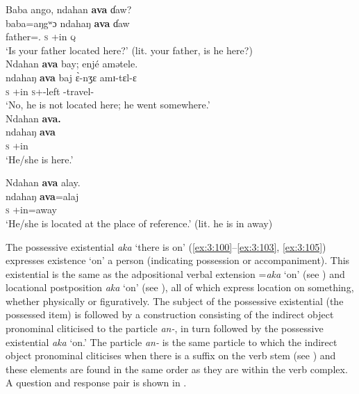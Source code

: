 \ea\label{ex:3:97}
\ea Baba  ango,  ndahan  \textbf{ava}  ɗaw? \\
\gll  baba=aŋgʷɔ      ndahaŋ    \textbf{ava}  ɗaw \\
      father={\twoS}.{\POSS}    \textsc{s}        {\EXT}+in   {\textsc{q}} \\
\glt  `Is your father located here?' (lit. your father, is he here?)     
       \\\medskip
       \ex
 Ndahan  \textbf{ava}  bay;  enjé  amətele.\\
\gll ndahaŋ  \textbf{ava}  baj    \`{ɛ}-nʒɛ    amɪ-tɛl-ɛ\\
        \textsc{s}       {\EXT}+in  {\NEG}   \textsc{s}+{\PFV}-left {\DEP}-travel-{\CL}\\
\glt   `No, he is not located here; he went somewhere.'\\
\z\z%
\ea\label{ex:3:98}
Ndahan  \textbf{ava.}\\
\gll  ndahaŋ  \textbf{ava}\\
      \textsc{s}    {\EXT}+in\\
\glt  ‘He/she is here.’
\z

\ea \label{ex:3:99}
Ndahan  \textbf{ava}  alay.\\
\gll  ndahaŋ  \textbf{ava}=alaj\\
      \textsc{s}    {\EXT}+in=away\\
\glt  ‘He/she is located at the place of reference.’ (lit. he is in away)
\z
 
The possessive existential \textit{aka} ‘there is on’ (\ref{ex:3:100}--\ref{ex:3:103}, \ref{ex:3:105}) expresses existence ‘on’ a person (indicating possession or accompaniment).  This existential is the same as the adpositional verbal extension =\textit{aka} ‘on’ (see ) and locational postposition \textit{aka} ‘on’ (see ), all of which express location on something, whether physically or figuratively. The subject of the possessive existential (the possessed item) is followed by a construction consisting of the indirect object pronominal cliticised to the particle \textit{an-}, in turn followed by the possessive existential \textit{aka} ‘on.’ The particle \textit{an- } is the same particle to which the indirect object pronominal cliticises when there is a suffix on the verb stem (see ) and these elements are found in the same order as they are within the verb complex. A question and response pair is shown in .

